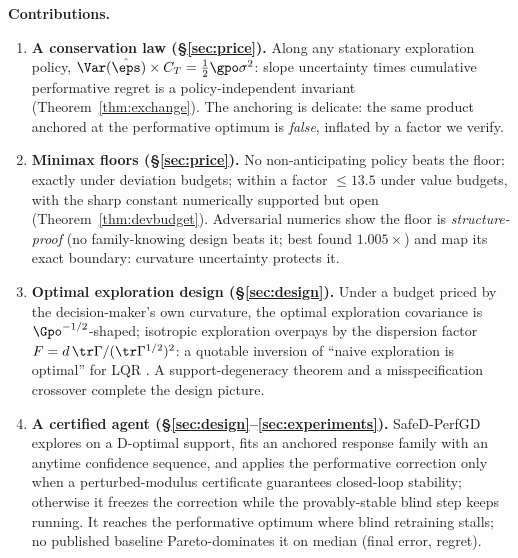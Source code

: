 \documentclass{article}
\begin{document}
\textbf{Contributions.}
\begin{enumerate}\itemsep1pt
\item \textbf{A conservation law (\S\ref{sec:price}).} Along any stationary exploration policy, $\Var(\hat\eps)\times C_T = \tfrac{1}{2}\gpo\sigma^2$: slope uncertainty times cumulative performative regret is a policy-independent invariant (Theorem~\ref{thm:exchange}). The anchoring is delicate: the same product anchored at the performative optimum is \emph{false}, inflated by a factor we verify.
\item \textbf{Minimax floors (\S\ref{sec:price}).} No non-anticipating policy beats the floor: exactly under deviation budgets; within a factor $\le 13.5$ under value budgets, with the sharp constant numerically supported but open (Theorem~\ref{thm:devbudget}). Adversarial numerics show the floor is \emph{structure-proof} (no family-knowing design beats it; best found $1.005\times$) and map its exact boundary: curvature uncertainty protects it.
\item \textbf{Optimal exploration design (\S\ref{sec:design}).} Under a budget priced by the decision-maker's own curvature, the optimal exploration covariance is $\Gpo^{-1/2}$-shaped; isotropic exploration overpays by the dispersion factor $F = d\,\tr\Gamma/(\tr\Gamma^{1/2})^2$: a quotable inversion of ``naive exploration is optimal'' for LQR \citep{simchowitz2020naive}. A support-degeneracy theorem and a misspecification crossover complete the design picture.
\item \textbf{A certified agent (\S\ref{sec:design}--\ref{sec:experiments}).} SafeD-PerfGD explores on a D-optimal support, fits an anchored response family with an anytime confidence sequence, and applies the performative correction only when a perturbed-modulus certificate guarantees closed-loop stability; otherwise it freezes the correction while the provably-stable blind step keeps running. It reaches the performative optimum where blind retraining stalls; no published baseline Pareto-dominates it on median (final error, regret).
\end{enumerate}
\end{document}
